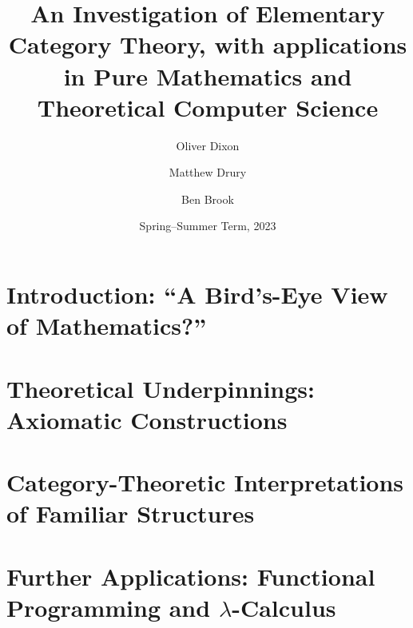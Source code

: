 \documentclass[10pt,a4paper]{amsart}
\title[An Investigation of Elementary Category Theory]{An Investigation of %
        Elementary Category Theory, with applications in Pure Mathematics and %
        Theoretical Computer Science}
\author{Oliver Dixon}  \email{\yorkemail{od641}}
\author{Matthew Drury} \email{\yorkemail{md1499}}
\author{Ben Brook}     \email{\yorkemail{bb1170}}
\date{Spring--Summer Term, 2023}
\begin{document}
%
\begin{abstract}
        \lipsum[1-1]
\end{abstract}
\maketitle
\tableofcontents
\section{Introduction: ``A Bird's-Eye View of Mathematics?''}
\lipsum[2-8]
\section{Theoretical %
        Underpinnings: Axiomatic Constructions}
\lipsum[9-28]
\section{Category-Theoretic %
        Interpretations of Familiar Structures}
\lipsum[29-48]
\section{Further Applications: %
        Functional Programming and \texorpdfstring{$\lambda$}{Lambda}-Calculus}
\lipsum[49-68]
\printbibliography[title=Cited Works and Further Reading]
%
\end{document}

